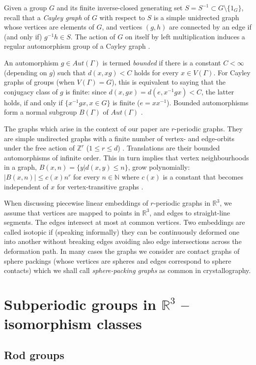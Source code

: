 \documentclass[11pt,a4paper]{article}
\newcommand{\N}{\mathbb N}
\newcommand{\Z}{\mathbb Z}
\newcommand{\R}{\mathbb R}
\begin{document}
Given a group $G$ and its finite inverse-closed generating set $S = S^{-1} \subset G \setminus \{1_G\}$, recall that a \emph{Cayley graph} of $G$ with respect to $S$ is a simple unidrected graph whose vertices are elements of $G$, and vertices $(g, h)$ are connected by an edge if (and only if) $g^{-1}h \in S$. The action of $G$ on itself by left multiplication induces a regular automorphism group of a Cayley graph \cite{Biggs93}.

An automorphism $g \in Aut(\Gamma)$ is termed \emph{bounded} if there is a constant $C < \infty$ (depending on $g$) such that $d(x, xg) < C$ holds for every $x \in V(\Gamma)$. For Cayley graphs of groups (when $V(\Gamma) = G$), this is equivalent to saying that the conjugacy class of $g$ is finite: since $d(x, gx) = d(e, x^{-1}gx) < C$, the latter holds, if and only if $\{x^{-1}gx, x \in G\}$ is finite ($e=xx^{-1}$). Bounded automorphisms form a normal subgroup $B(\Gamma)$ of $Aut(\Gamma)$ \cite{Seif89all, Seif91}.

The graphs which arise in the context of our paper are $r$-periodic graphs. They are simple undirected graphs with a finite number of vertex- and edge-orbits under the free action of $\Z^r$ ($1 \leq r \leq d$) \cite{Delgado2004}. Translations are their bounded automorphisms of infinite order. This in turn implies that vertex neighbourhoods in a graph, $B(x, n) = \{y|d(x, y) \leq n\}$, grow polynomially: $|B(x, n)| \leq c(x)n^r$ for every $n \in \N$ where $c(x)$ is a constant that becomes independent of $x$ for vertex-transitive graphs \cite{Gods80, Seif97}.

When discussing piecewise linear embeddings of $r$-periodic graphs in $\R^3$, we assume that vertices are mapped to points in $\R^3$, and  edges to straight-line segments. The edges intersect at most at common vertices. Two embeddings are called isotopic if (speaking informally) they can be continuously deformed one into another without breaking edges avoiding also edge intersections across the deformation path. In many cases the graphs we consider are contact graphs of sphere packings (whose vertices are spheres and edges correspond to sphere contacts) which we shall call \emph{sphere-packing graphs} as common in crystallography.


\section{Subperiodic groups in $\R^3$ -- isomorphism classes}

\subsection{Rod groups} \label{rod1}
\end{document}
